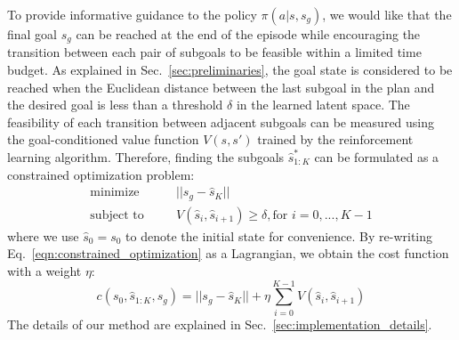 To provide informative guidance to the policy $\pi(a | s, s_g)$, we would like that the final goal $s_g$ can be reached at the end of the episode while encouraging the transition between each pair of subgoals to be feasible within a limited time budget. As explained in Sec.~\ref{sec:preliminaries}, the goal state is considered to be reached when the Euclidean distance
between the last subgoal in the plan and the desired goal is less than a threshold $\delta$ in the learned latent space. The feasibility of each transition between adjacent subgoals can be measured using the goal-conditioned value function $V(s, s')$ trained by the reinforcement learning algorithm. Therefore, finding the subgoals $\hat{s}_{1:K}^*$ can be formulated as a constrained optimization problem: 
\begin{eqnarray}\label{eqn:constrained_optimization}
    \text{minimize} 
    & \quad & ||s_g - \hat{s}_K|| \\
    \text{subject to} 
    & \quad & V(\hat{s}_i, \hat{s}_{i+1}) \geq \delta, \text{for $i = 0, ..., K-1$} \nonumber
\end{eqnarray}
where we use $\hat{s}_0 = s_0$ to denote the initial state for convenience. By re-writing Eq.~\ref{eqn:constrained_optimization} as a Lagrangian,
we obtain the cost function with a weight $\eta$:
\begin{equation}
    c(s_0, \hat{s}_{1:K}, s_g) = ||s_g - \hat{s}_K|| + \eta \sum_{i=0}^{K-1} V(\hat{s}_i, \hat{s}_{i+1})
    \label{eqn:cost_function}
\end{equation}
The details of our method are explained in Sec.~\ref{sec:implementation_details}.